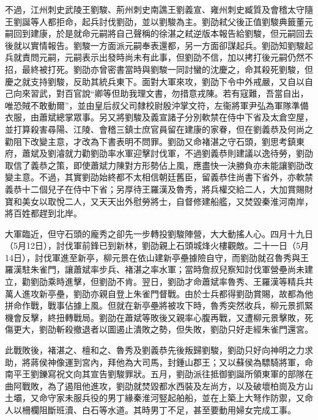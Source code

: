 不過，江州刺史武陵王劉駿、荊州刺史南譙王劉義宣、雍州刺史臧質及會稽太守隨王劉誕等人都拒命，起兵討伐劉劭，並以劉駿為主。劉劭弒父後正值劉駿典籤董元嗣回到建康，於是就命元嗣將自己聲稱的徐湛之弒逆版本報告給劉駿，但元嗣回去後就以實情報告。劉駿一方面派元嗣奉表還都，另一方面卻謀起兵。劉劭知劉駿起兵就責問元嗣，元嗣表示出發時尚未有此事，但劉劭不信，加以拷打後元嗣仍然不招，最終被打死。劉劭亦曾密書當時與劉駿一同討蠻的沈慶之，命其殺死劉駿，但慶之就支持劉駿，反助其統兵東下。面對大軍來攻，劉劭下令中外戒嚴，又自以自己向來習武，對百官說“卿等但助我理文書，勿措意戎陳。若有寇難，吾當自出，唯恐賊不敢動爾”，並由皇后叔父司隸校尉殷沖掌文符，左衞將軍尹弘為軍隊準備衣服，由蕭斌總掌眾事。另又將劉駿及義宣諸子分別軟禁在侍中下省及太倉空屋，並打算殺害尋陽、江陵、會稽三鎮士庶官員留在建康的家眷，但在劉義恭及何尚之勸阻下改變主意，才改為下書表明不問罪。劉劭又命褚湛之守石頭，劉思考鎮東府，蕭斌及劉濬就力勸劉劭率水軍迎擊討伐軍，不過劉義恭則建議以逸待勞，劉劭取信了義恭之策，即使蕭斌力陳對方形勢佔上風，應盡快一決勝負亦未能讓劉劭改變主意。不過，其實劉劭始終都不太相信朝廷舊臣，留義恭住尚書下省外，亦軟禁義恭十二個兒子在侍中下省；另厚待王羅漢及魯秀，將兵權交給二人，大加賞賜財寶和美女以取悅二人，又天天出外慰勞將士，自督修建船艦，又焚毀秦淮河南岸，將百姓都趕到北岸。

大軍臨近，但守石頭的龐秀之卻先一步轉投劉駿陣營，大大動搖人心。四月十九日（5月12日），討伐軍前鋒已到新林，劉劭親上石頭城烽火樓觀敵。二十一日（5月14日），討伐軍進至新亭，柳元景在依山建新亭壘據險自守，而劉劭就召魯秀與王羅漢駐朱雀門，讓蕭斌率步兵、褚湛之率水軍；當時詹叔兒察知討伐軍營壘尚未建立，勸劉劭乘時進擊，但劉劭不肯。翌日，劉劭才命蕭斌率魯秀、王羅漢等精兵共萬人進攻新亭壘，劉劭亦親自登上朱雀門督戰。由於士兵都得劉劭賞賜，故都為他拼命作戰，戰事佔據上風。但就在新亭壘將被攻下時，魯秀突然收兵，柳元景抓緊機會反擊，終扭轉戰局。劉劭在蕭斌等敗後又親率心腹再戰，又遭柳元景擊敗，死傷更大，劉劭斬殺撤退者以圖遏止潰敗之勢，但失敗，劉劭只好走經朱雀門還宮。

此戰敗後，褚湛之、檀和之、魯秀及劉義恭先後叛歸劉駿，劉劭只好向神明之力求助，將蔣侯神像運到宮內，拜他為大司馬，封鍾山郡王；又以蘇侯為驃騎將軍，命南平王劉鑠寫祝文向其宣告劉駿罪狀。五月，劉劭派往抵御劉誕所領東軍的部隊在曲阿戰敗，為了遏阻他進攻，劉劭就焚毀都水西裝及左尚方，以及破壞柏崗及方山土壩，又命守家未服兵役的男丁緣秦淮河竪起舶船，並在上築上大弩作防禦，又命人以柵欄阻斷班瀆、白石等水道。其時男丁不足，甚至要動用婦女完成工事。

